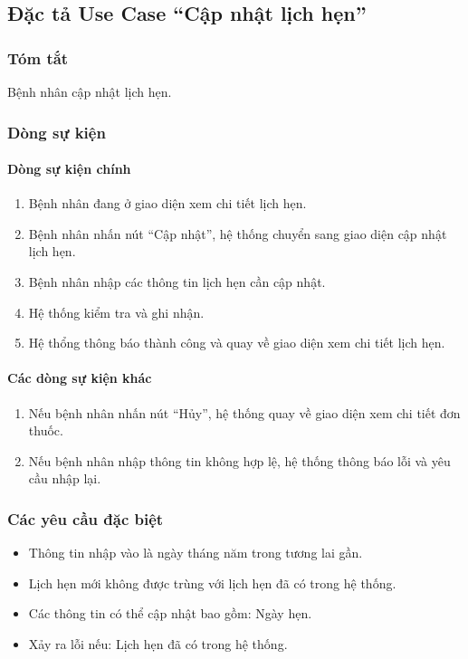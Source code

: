 \subsection{Đặc tả Use Case ``Cập nhật lịch hẹn''}

\subsubsection{Tóm tắt}
Bệnh nhân cập nhật lịch hẹn.

\subsubsection{Dòng sự kiện}
\paragraph{\textbf{Dòng sự kiện chính}}
\begin{enumerate}
  \item Bệnh nhân đang ở giao diện xem chi tiết lịch hẹn.
  \item Bệnh nhân nhấn nút ``Cập nhật'', hệ thống chuyển sang giao diện cập nhật lịch hẹn.
  \item Bệnh nhân nhập các thông tin lịch hẹn cần cập nhật.
  \item Hệ thống kiểm tra và ghi nhận.
  \item Hệ thổng thông báo thành công và quay về giao diện xem chi tiết lịch hẹn.
\end{enumerate}

\paragraph{\textbf{Các dòng sự kiện khác}}
\begin{enumerate}
  \item Nếu bệnh nhân nhấn nút ``Hủy'', hệ thống quay về giao diện xem chi tiết đơn thuốc.
  \item Nếu bệnh nhân nhập thông tin không hợp lệ, hệ thống thông báo lỗi và yêu cầu nhập lại.
\end{enumerate}

\subsubsection{Các yêu cầu đặc biệt}
\begin{itemize}
  \item Thông tin nhập vào là ngày tháng năm trong tương lai gần.
  \item Lịch hẹn mới không được trùng với lịch hẹn đã có trong hệ thống.
  \item Các thông tin có thể cập nhật bao gồm: Ngày hẹn.
  \item Xảy ra lỗi nếu: Lịch hẹn đã có trong hệ thống.
\end{itemize}

